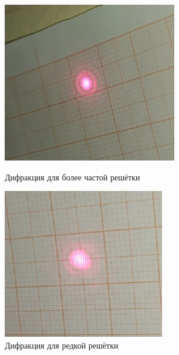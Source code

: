 \documentclass[titlepage, a4paper,12pt]{article}
\begin{document}
		\begin{figure}[h!]
		\begin{center}
			\begin{minipage}[h]{0.49\linewidth}
				\includegraphics[width=1\linewidth]{2_1}
				\caption{Дифракция для более частой решётки} %
				\label{ris:2.1} %
			\end{minipage}
		\hfill
			\begin{minipage}[h]{0.49\linewidth}
				\includegraphics[width=1\linewidth]{2_2}
				\caption{Дифракция для редкой решётки}
				\label{ris:2.2}
			\end{minipage}
		\end{center}
	\end{figure}
	
\end{document}

